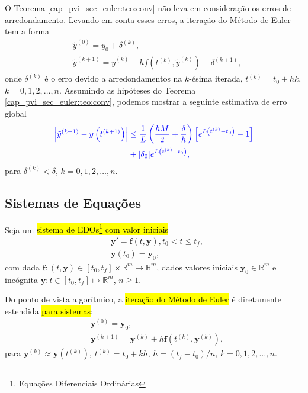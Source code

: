 O Teorema \ref{cap_pvi_sec_euler:teo:conv} não leva em consideração os erros de arredondamento. Levando em conta esses erros, a iteração do Método de Euler tem a forma
\begin{subequations}\label{cap_pvi_sec_euler:eq:euler_errarr}
  \begin{align}
    &\tilde{y}^{(0)} = y_0 + \delta^{(k)},\\
    &\tilde{y}^{(k+1)} = \tilde{y}^{(k)} + hf\left(t^{(k)}, \tilde{y}^{(k)}\right) + \delta^{(k+1)},
  \end{align}
\end{subequations}
onde $\delta^{(k)}$ é o erro devido a arredondamentos na $k$-ésima iterada, $t^{(k)} = t_0 + hk$, $k=0, 1, 2, \dotsc, n$. Assumindo as hipóteses do Teorema \ref{cap_pvi_sec_euler:teo:conv}, podemos mostrar a seguinte estimativa de erro global
\begin{equation}\label{cap_pvi_sec_euler:eq:euler_errarr_est}\color{blue}\begin{aligned}
    \left|\tilde{y}^{(k+1)} - y\left(t^{(k+1)}\right)\right| &\leq \frac{1}{L}\left(\frac{hM}{2} + \frac{\delta}{h}\right)\left[e^{L\left(t^{(k)}-t_0\right)}-1\right]\\
    &+ |\delta_0|e^{L\left(t^{(k)}-t_0\right)},
\end{aligned}
\end{equation}
para $\delta^{(k)} < \delta$, $k=0, 1, 2, \dotsc, n$.

\subsection{Sistemas de Equações}

Seja um \hl{sistema de EDOs\footnote{Equações Diferenciais Ordinárias} com valor iniciais}
\begin{subequations}\label{cap_pvi_sec_euler:eq:sistem}
  \begin{align}
    &\pmb{y}' = \pmb{f}(t, \pmb{y}), t_0 < t \leq t_f,\\
    &\pmb{y}(t_0) = \pmb{y}_0,
  \end{align}
\end{subequations}
com dada $\pmb{f}:(t, \pmb{y})\in [t_0, t_f]\times\mathbb{R}^m\mapsto \mathbb{R}^m$, dados valores iniciais $\pmb{y}_0\in\mathbb{R}^m$ e incógnita $\pmb{y}:t\in [t_0, t_f]\mapsto \mathbb{R}^m$, $n\geq 1$.

Do ponto de vista algorítmico, a \hl{iteração do Método de Euler} é diretamente estendida \hl{para sistemas}:
\begin{equation}
  \begin{aligned}
    &\pmb{y}^{(0)} = \pmb{y}_0,\\
    &\pmb{y}^{(k+1)} = \pmb{y}^{(k)} + h\pmb{f}\left(t^{(k)}, \pmb{y}^{(k)}\right),
  \end{aligned}
\end{equation}
para $\pmb{y}^{(k)}\approx \pmb{y}\left(t^{(k)}\right)$, $t^{(k)} = t_0 + kh$, $h = (t_f-t_0)/n$, $k = 0, 1, 2, \dotsc, n$.

